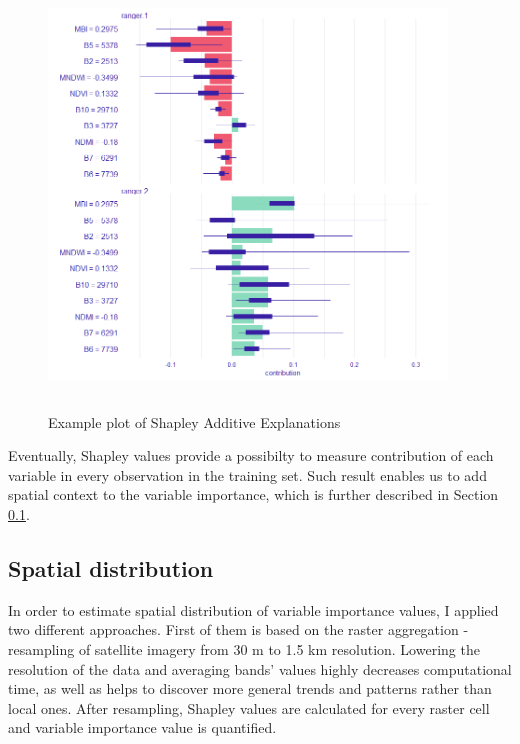 \documentclass{amuthesis}
\begin{document}
\begin{figure}[H]

{\centering \includegraphics[width=4.16667in,height=4.45833in]{./figures/shapley_values.png}

}

\caption{\label{fig-rycina8}Example plot of Shapley Additive
Explanations}

\end{figure}

Eventually, Shapley values provide a possibilty to measure contribution
of each variable in every observation in the training set. Such result
enables us to add spatial context to the variable importance, which is
further described in Section \ref{sec-importance-distribution}.

\hypertarget{sec-importance-distribution}{%
\subsection{Spatial distribution}\label{sec-importance-distribution}}

In order to estimate spatial distribution of variable importance values,
I applied two different approaches. First of them is based on the raster
aggregation - resampling of satellite imagery from 30 m to 1.5 km
resolution. Lowering the resolution of the data and averaging bands'
values highly decreases computational time, as well as helps to discover
more general trends and patterns rather than local ones. After
resampling, Shapley values are calculated for every raster cell and
variable importance value is quantified.
\end{document}
